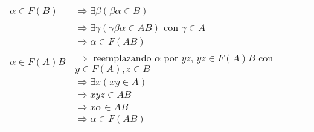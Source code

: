 \begin{tabular}{l l}
    $\alpha \in F(B)$ & $\Rightarrow \exists \beta (\beta \alpha \in B)$ \\
                      & $\Rightarrow \exists \gamma (\gamma \beta \alpha \in AB)$ con $\gamma \in A$ \\
                      & $\Rightarrow \alpha \in F(AB)$ \\

    $\alpha \in F(A)B$ & $\Rightarrow$ reemplazando $\alpha$ por $yz$, $yz \in F(A)B$ con $y \in F(A), z \in B$ \\
                       & $\Rightarrow \exists x (xy \in A)$ \\
                       & $\Rightarrow xyz \in AB$ \\
                       & $\Rightarrow x \alpha \in AB$ \\
                       & $\Rightarrow \alpha \in F(AB)$ \\
\end{tabular}
